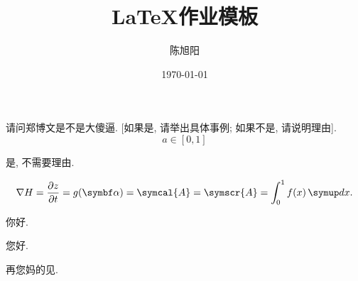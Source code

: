 \documentclass[biblatex, chinese, lineno, watermark]{assignment}
\title{\LaTeX 作业模板}
\author{陈旭阳}
\date{\today}
\institute{同济大学数学科学学院}
\begin{document}
    \maketitle

    \begin{problem}
        请问郑博文是不是大傻逼. [如果是, 请举出具体事例; 如果不是, 请说明理由].
        \begin{equation}
            a\in[0, 1]
        \end{equation}
    \end{problem}

    \begin{solution}
        是, 不需要理由.

        \begin{equation}
            \nabla{H}=\frac{\partial{z}}{\partial{t}}=g(\vect{\alpha}) = \symcal{A} = \symscr{A} = \int_{0}^{1}f(x)\diff x.
        \end{equation}

        你好.


    \end{solution}

    \clearpage

    您好.

    \begin{problem}
        再您妈的见.
    \end{problem}
\end{document}
